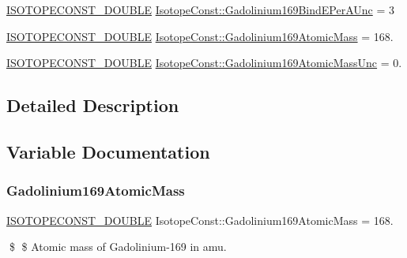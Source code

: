 \begin{DoxyCompactItemize}
\mbox{\hyperlink{group___isotope_const-_macros_ga8f45a7272ce02c0b4c65c44636ed719a}{I\+S\+O\+T\+O\+P\+E\+C\+O\+N\+S\+T\+\_\+\+D\+O\+U\+B\+LE}} \mbox{\hyperlink{group___isotope_const-_gadolinium-_gd169_ga38605dd9ba795c66a1b8aa9b2a820d28}{Isotope\+Const\+::\+Gadolinium169\+Bind\+E\+Per\+A\+Unc}} = 3
\item 
\mbox{\hyperlink{group___isotope_const-_macros_ga8f45a7272ce02c0b4c65c44636ed719a}{I\+S\+O\+T\+O\+P\+E\+C\+O\+N\+S\+T\+\_\+\+D\+O\+U\+B\+LE}} \mbox{\hyperlink{group___isotope_const-_gadolinium-_gd169_ga5fbe9b68b5882f8b27ddec71574064c6}{Isotope\+Const\+::\+Gadolinium169\+Atomic\+Mass}} = 168.
\item 
\mbox{\hyperlink{group___isotope_const-_macros_ga8f45a7272ce02c0b4c65c44636ed719a}{I\+S\+O\+T\+O\+P\+E\+C\+O\+N\+S\+T\+\_\+\+D\+O\+U\+B\+LE}} \mbox{\hyperlink{group___isotope_const-_gadolinium-_gd169_ga1afd6dfcaaf3f6a5560c7b5fd89cc019}{Isotope\+Const\+::\+Gadolinium169\+Atomic\+Mass\+Unc}} = 0.
\end{DoxyCompactItemize}


\subsection{Detailed Description}


\subsection{Variable Documentation}
\mbox{\label{group___isotope_const-_gadolinium-_gd169_ga5fbe9b68b5882f8b27ddec71574064c6}} 
\subsubsection{\texorpdfstring{Gadolinium169\+Atomic\+Mass}{Gadolinium169AtomicMass}}
{\footnotesize\ttfamily \mbox{\hyperlink{group___isotope_const-_macros_ga8f45a7272ce02c0b4c65c44636ed719a}{I\+S\+O\+T\+O\+P\+E\+C\+O\+N\+S\+T\+\_\+\+D\+O\+U\+B\+LE}} Isotope\+Const\+::\+Gadolinium169\+Atomic\+Mass = 168.}

\$ \$ Atomic mass of Gadolinium-\/169 in amu. \mbox{\label{group___isotope_const-_gadolinium-_gd169_ga1afd6dfcaaf3f6a5560c7b5fd89cc019}} 
